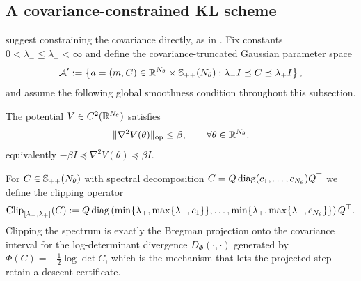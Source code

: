 \subsection{A covariance-constrained KL scheme}

 suggest constraining the covariance directly, as in \citet{sun2025natural}. Fix constants $0 < \lambda_- \leq \lambda_+ < \infty$ and define the covariance-truncated Gaussian parameter space
\begin{equation*}
    \mathcal{A}' := \left\{ a = (m, C) \in \mathbb{R}^{N_\theta} \times \mathbb{S}_{++} (N_\theta) : \lambda_- I \preceq C \preceq \lambda_+ I \right\},
\end{equation*}
and assume the following global smoothness condition throughout this subsection.

\begin{assumption}\label{assump:smooth}
    The potential $V \in C^2 (\mathbb{R}^{N_\theta})$ satisfies
    \begin{equation*}
        \| \nabla^2 V (\theta) \|_{\mathrm{op}} \leq \beta, \qquad \forall \theta \in \mathbb{R}^{N_\theta},
    \end{equation*}
    equivalently $-\beta I \preceq \nabla^2 V (\theta) \preceq \beta I$.
\end{assumption}

For $C \in \mathbb{S}_{++} (N_\theta)$ with spectral decomposition $C = Q \operatorname{diag} (c_1, \ldots, c_{N_\theta}) Q^\top$ we define the clipping operator
\begin{equation*}
    \operatorname{Clip}_{[\lambda_-, \lambda_+]} (C) := Q \operatorname{diag} \left( \min \{ \lambda_+, \max \{ \lambda_-, c_1 \} \}, \ldots, \min \{ \lambda_+, \max \{ \lambda_-, c_{N_\theta} \} \} \right) Q^\top.
\end{equation*}
Clipping the spectrum is exactly the Bregman projection onto the covariance interval for the log-determinant divergence $D_\Phi (\cdot, \cdot)$ generated by $\Phi (C) = -\frac{1}{2} \log \det C$, which is the mechanism that lets the projected step retain a descent certificate.

